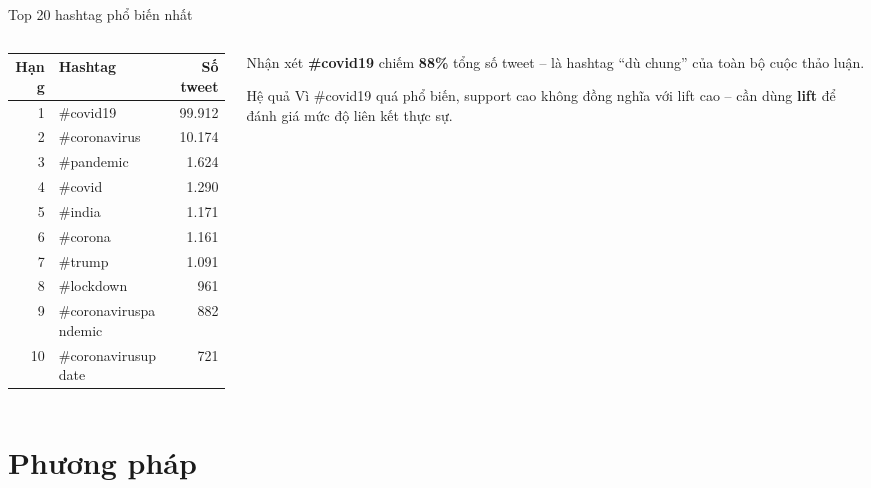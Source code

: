 \documentclass[aspectratio=169]{beamer}
\begin{document}
\begin{frame}{Top 20 hashtag phổ biến nhất}
  \begin{columns}[T]
    \begin{column}{0.52\textwidth}
      \begin{tabular}{rlr}
        \toprule
        \textbf{Hạng} & \textbf{Hashtag} & \textbf{Số tweet} \\
        \midrule
        1  & \#covid19             & 99.912 \\
        2  & \#coronavirus         & 10.174 \\
        3  & \#pandemic            & 1.624  \\
        4  & \#covid               & 1.290  \\
        5  & \#india               & 1.171  \\
        6  & \#corona              & 1.161  \\
        7  & \#trump               & 1.091  \\
        8  & \#lockdown            & 961    \\
        9  & \#coronaviruspandemic & 882    \\
        10 & \#coronavirusupdate   & 721    \\
        \bottomrule
      \end{tabular}
    \end{column}
    \begin{column}{0.44\textwidth}
      \begin{alertblock}{Nhận xét}
        \textbf{\#covid19} chiếm \textbf{88\%} tổng số tweet -- là hashtag ``dù chung'' của toàn bộ cuộc thảo luận.
      \end{alertblock}
      \vspace{0.5em}
      \begin{block}{Hệ quả}
        Vì \#covid19 quá phổ biến, support cao không đồng nghĩa với lift cao -- cần dùng \textbf{lift} để đánh giá mức độ liên kết thực sự.
      \end{block}
    \end{column}
  \end{columns}
\end{frame}

\section{Phương pháp}
\end{document}
